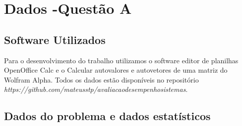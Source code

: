 \documentclass[11pt,a4paper,openany,oneside]{abntex2}
\begin{document}
\chapter{Dados -Questão A}
\label{qa}


\section{\textbf{Software Utilizados}}
\label{qas}
	Para o desenvolvimento do trabalho utilizamos o software editor de planilhas OpenOffice Calc e o Calcular autovalores e autovetores de uma matriz do Wolfram Alpha\cite{img}.
	Todos os dados estão disponíveis no repositório \textit{https://github.com/mateusstp/avaliacaodesempenhosistemas}.



\section{\textbf{Dados do problema e dados estatísticos }}
\label{qade}
	
\end{document}
